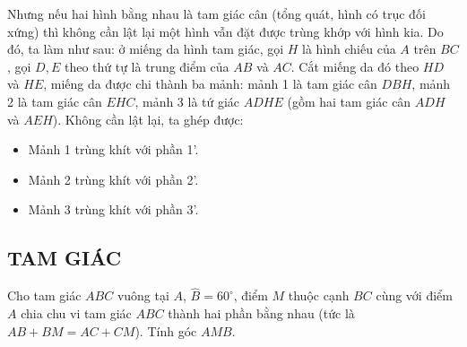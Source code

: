 \begin{vd}
{\begin{center}
        \end{center}
        Nhưng nếu hai hình bằng nhau là tam giác cân (tổng quát, hình có trục đối xứng) thì không cần lật lại một hình vẫn đặt được trùng khớp với hình kia.
        Do đó, ta làm như sau: ở miếng da hình tam giác, gọi $H$ là hình chiếu của $A$ trên $BC$, gọi $D,E$ theo thứ tự là trung điểm của $AB$ và $AC$. Cắt miếng da đó theo $HD$ và $HE$, miếng da được chi thành ba mảnh: mảnh 1 là tam giác cân $DBH$, mảnh 2 là tam giác cân $EHC$, mảnh 3 là tứ giác $ADHE$ (gồm hai tam giác cân $ADH$ và $AEH$). Không cần lật lại, ta ghép được:
      \begin{itemize}
      	\item Mảnh 1 trùng khít với phần 1'.
      	\item Mảnh 2 trùng khít với phần 2'.
      	\item Mảnh 3 trùng khít với phần 3'.
      \end{itemize}           
    }
\end{vd}
\subsection{TAM GIÁC}
\begin{vd}
    Cho tam giác $ABC$ vuông tại $A$, $\widehat{B}=60^\circ$, điểm $M$ thuộc cạnh $BC$ cùng với điểm $A$ chia chu vi tam giác $ABC$ thành hai phần bằng nhau (tức là $AB+BM=AC+CM$). Tính góc $AMB$.
\end{vd}
